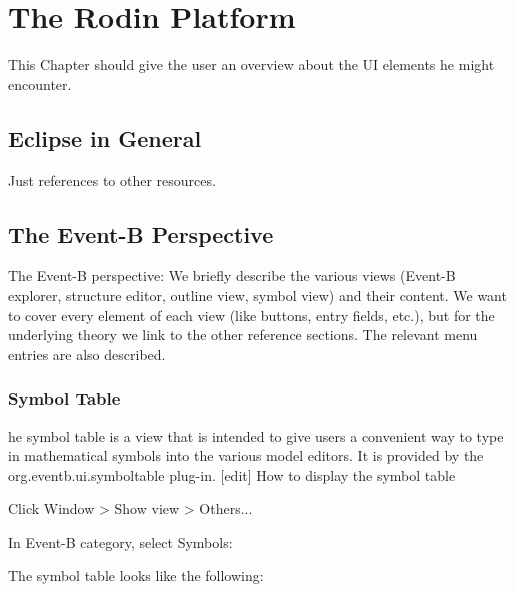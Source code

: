 \section{The Rodin Platform}
\label{reference_01}

This Chapter should give the user an overview about the UI elements he might encounter.

\subsection{Eclipse in General}

Just references to other resources.

\subsection{The Event-B Perspective}

The Event-B perspective: We briefly describe the various views (Event-B explorer, structure editor, outline view, symbol view) and their content. We want to cover every element of each view (like buttons, entry fields, etc.), but for the underlying theory we link to the other reference sections. The relevant menu entries are also described.

\subsubsection{Symbol Table}


he symbol table is a view that is intended to give users a convenient way to type in mathematical symbols into the various model editors. It is provided by the org.eventb.ui.symboltable plug-in.
[edit] How to display the symbol table

Click Window > Show view > Others...

In Event-B category, select Symbols: 


The symbol table looks like the following: 


